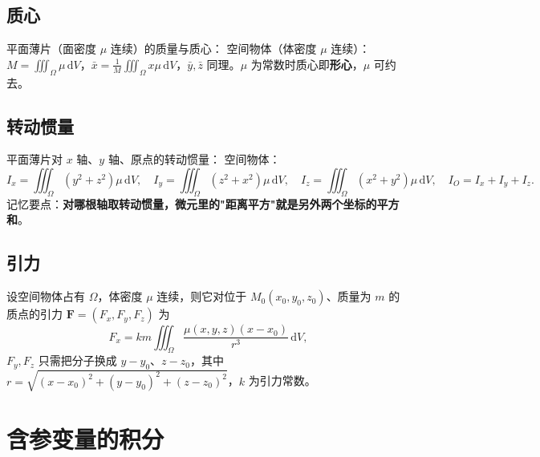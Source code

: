
\subsection{质心}

平面薄片（面密度 $\mu$ 连续）的质量与质心：
空间物体（体密度 $\mu$ 连续）：$M=\iiint_\Omega\mu\,\mathrm{d}V$，$\bar x=\frac{1}{M}\iiint_\Omega x\mu\,\mathrm{d}V$，$\bar y,\bar z$ 同理。$\mu$ 为常数时质心即\textbf{形心}，$\mu$ 可约去。

\subsection{转动惯量}

平面薄片对 $x$ 轴、$y$ 轴、原点的转动惯量：
空间物体：
\[
I_x=\iiint_\Omega(y^2+z^2)\mu\,\mathrm{d}V,\quad
I_y=\iiint_\Omega(z^2+x^2)\mu\,\mathrm{d}V,\quad
I_z=\iiint_\Omega(x^2+y^2)\mu\,\mathrm{d}V,\quad
I_O=I_x+I_y+I_z .
\]
记忆要点：\textbf{对哪根轴取转动惯量，微元里的"距离平方"就是另外两个坐标的平方和}。

\subsection{引力}

设空间物体占有 $\Omega$，体密度 $\mu$ 连续，则它对位于 $M_0(x_0,y_0,z_0)$、质量为 $m$ 的质点的引力 $\boldsymbol F=(F_x,F_y,F_z)$ 为
\[
F_x=km\iiint_\Omega\frac{\mu(x,y,z)(x-x_0)}{r^{3}}\,\mathrm{d}V ,
\]
$F_y,F_z$ 只需把分子换成 $y-y_0$、$z-z_0$，其中 $r=\sqrt{(x-x_0)^2+(y-y_0)^2+(z-z_0)^2}$，$k$ 为引力常数。


\section{含参变量的积分}

